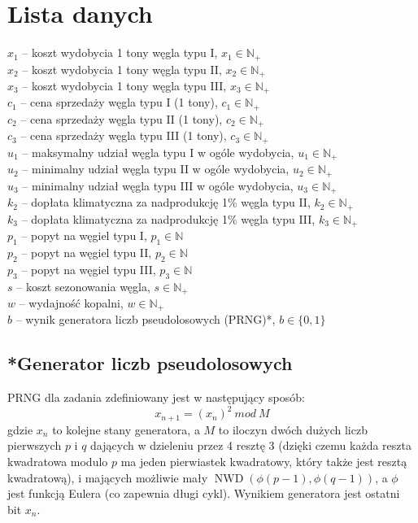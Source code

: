 \documentclass[titlepage]{article}
\begin{document}
\section{Lista danych}
$x_1$ -- koszt wydobycia 1 tony węgla typu I, $x_1 \in \mathbb{N_+}$ \\
$x_2$ -- koszt wydobycia 1 tony węgla typu II, $x_2 \in \mathbb{N_+}$ \\
$x_3$ -- koszt wydobycia 1 tony węgla typu III, $x_3 \in \mathbb{N_+}$ \\
$c_1$ -- cena sprzedaży węgla typu I (1 tony), $c_1 \in \mathbb{N_+}$ \\
$c_2$ -- cena sprzedaży węgla typu II (1 tony), $c_2 \in \mathbb{N_+}$ \\
$c_3$ -- cena sprzedaży węgla typu III (1 tony), $c_3 \in \mathbb{N_+}$ \\
$u_1$ -- maksymalny udział węgla typu I w ogóle wydobycia, $u_1 \in \mathbb{N_+}$ \\
$u_2$ -- minimalny udział węgla typu II w ogóle wydobycia, $u_2 \in \mathbb{N_+}$ \\
$u_3$ -- minimalny udział węgla typu III w ogóle wydobycia, $u_3 \in \mathbb{N_+}$ \\
$k_2$ -- dopłata klimatyczna za nadprodukcję 1\% węgla typu II, $k_2 \in \mathbb{N_+}$ \\
$k_3$ -- dopłata klimatyczna za nadprodukcję 1\% węgla typu III, $k_3 \in \mathbb{N_+}$ \\
$p_1$ -- popyt na węgiel typu I, $p_1 \in \mathbb{N}$ \\
$p_2$ -- popyt na węgiel typu II, $p_2 \in \mathbb{N}$ \\
$p_3$ -- popyt na węgiel typu III, $p_3 \in \mathbb{N}$ \\
$s$ -- koszt sezonowania węgla, $s \in \mathbb{N_+}$ \\
$w$ -- wydajność kopalni, $w \in \mathbb{N_+}$ \\
$b$ -- wynik generatora liczb pseudolosowych (PRNG)*, $b \in \{ 0, 1 \}$

\subsection{*Generator liczb pseudolosowych}
PRNG dla zadania zdefiniowany jest w następujący sposób:
$$x_{n + 1} = (x_n)^2 \ mod \ M$$
gdzie $x_n$ to kolejne stany generatora, a $M$ to iloczyn dwóch dużych liczb pierwszych $p$ i $q$ dających w dzieleniu przez 4 resztę 3 (dzięki czemu każda reszta kwadratowa modulo $p$ ma jeden pierwiastek kwadratowy,
który także jest resztą kwadratową), i mających możliwie mały $\operatorname{NWD}(\phi(p - 1), \phi(q - 1))$, a $\phi$ jest funkcją Eulera (co zapewnia długi cykl). Wynikiem generatora jest ostatni bit $x_n$.
\end{document}
